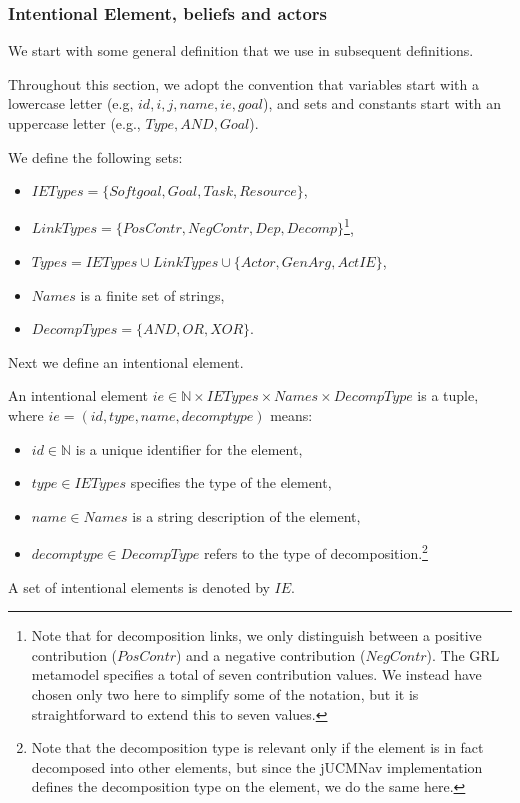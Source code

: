 \subsubsection{Intentional Element, beliefs and actors}

We start with some general definition that we use in subsequent definitions.

\begin{definition}
\label{def:set-definitions}
Throughout this section, we adopt the convention that variables start with a lowercase letter (e.g, $id, i, j, name, ie, goal$), and sets and constants start with an uppercase letter (e.g., $Type, AND, Goal$).

We define the following sets:
\begin{itemize}
\item $IETypes = \{Softgoal, Goal, Task, Resource\}$,
\item $LinkTypes = \{PosContr, NegContr, Dep, Decomp\}$\footnote{Note that for decomposition links, we only distinguish between a positive contribution ($PosContr$) and a negative contribution ($NegContr$). The GRL metamodel specifies a total of seven contribution values. We instead have chosen only two here to simplify some of the notation, but it is straightforward to extend this to seven values.},
\item $Types = IETypes \cup LinkTypes\cup\{Actor, GenArg, ActIE\}$,
\item $Names$ is a finite set of strings,
\item $DecompTypes = \{AND,OR,XOR\}$.
\end{itemize}
\end{definition}

Next we define an intentional element.

\begin{definition}
\label{def:ie}
An intentional element $ie\in \mathbb{N}\times IETypes\times Names\times DecompType$ is a tuple, where $ie = (id, type, name, decomptype)$ means:
\begin{itemize}
\item $id\in \mathbb{N}$ is a unique identifier for the element,
\item $type\in IETypes$ specifies the type of the element,
\item $name \in Names$ is a string description of the element,
\item $decomptype\in DecompType$ refers to the type of decomposition.\footnote{Note that the decomposition type is relevant only if the element is in fact decomposed into other elements, but since the jUCMNav implementation defines the decomposition type on the element, we do the same here.}
\end{itemize}
A set of intentional elements is denoted by $IE$.
\end{definition}

